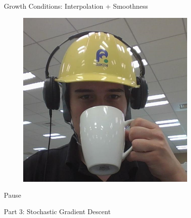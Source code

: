 \documentclass[mathserif,notheorems, hyperref={colorlinks, citecolor=blue, urlcolor=blue, linkcolor=blue}]{beamer}
\def\\{}%
\begin{document}
\begin{frame}{Growth Conditions: Interpolation + Smoothness}
\begin{center}
\begin{minipage}[t]{0.15\textwidth}
\begin{figure}[t]
                \vspace{0.5ex}

                \includegraphics[width=0.8\textwidth]{collaborators/fred}
            \end{figure} 
        \end{minipage}
        
    \end{center}
    \end{frame}


    \begin{frame}
        
       \begin{center}
          \huge Pause 
       \end{center} 
    \end{frame}

    
    \begin{frame}
       \begin{center}
          \huge Part 3: Stochastic Gradient Descent\\
       \end{center} 
    \end{frame}
    
\end{document}
